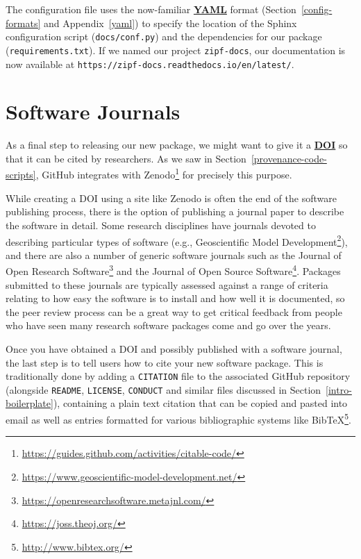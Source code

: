 \documentclass[
]{krantz}
\renewcommand{\href}[2]{#2\footnote{\url{#1}}}
\newcommand{\gref}[2]{\hyperlink{#2}{\textbf{#1}}}
\begin{document}
The configuration file uses the now-familiar \gref{YAML}{yaml} format
(Section~\ref{config-formats} and Appendix~\ref{yaml})
to specify the location of the Sphinx configuration script (\texttt{docs/conf.py})
and the dependencies for our package (\texttt{requirements.txt}).
If we named our project \texttt{zipf-docs},
our documentation is now available at \texttt{https://zipf-docs.readthedocs.io/en/latest/}.

\hypertarget{packaging-software-journals}{%
\section{Software Journals}\label{packaging-software-journals}}

As a final step to releasing our new package,
we might want to give it a \gref{DOI}{doi}
so that it can be cited by researchers.
As we saw in Section~\ref{provenance-code-scripts},
GitHub \href{https://guides.github.com/activities/citable-code/}{integrates with Zenodo}
for precisely this purpose.

While creating a DOI using a site like Zenodo
is often the end of the software publishing process,
there is the option of publishing
a journal paper to describe the software in detail.
Some research disciplines have journals devoted
to describing particular types of software
(e.g., \href{https://www.geoscientific-model-development.net/}{Geoscientific Model Development}),
and there are also a number of generic software journals such as the
\href{https://openresearchsoftware.metajnl.com/}{Journal of Open Research Software} and
the \href{https://joss.theoj.org/}{Journal of Open Source Software}.
Packages submitted to these journals are typically assessed against a range of criteria
relating to how easy the software is to install
and how well it is documented,
so the peer review process can be a great way to get critical feedback
from people who have seen many research software packages come and go over the years.

Once you have obtained a DOI and possibly published with a software journal,
the last step is to tell users how to cite your new software package.
This is traditionally done by adding a \texttt{CITATION} file
to the associated GitHub repository
(alongside \texttt{README}, \texttt{LICENSE}, \texttt{CONDUCT} and similar files discussed in Section~\ref{intro-boilerplate}),
containing a plain text citation that can be copied and pasted into email
as well as entries formatted for various bibliographic systems like \href{http://www.bibtex.org/}{BibTeX}.
\end{document}
